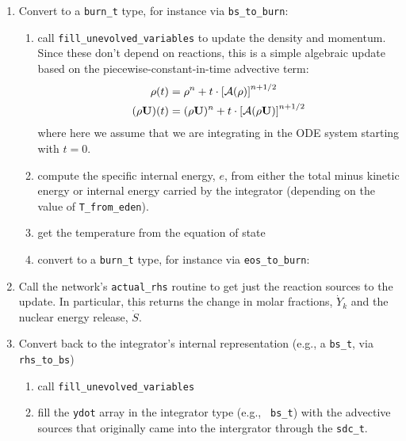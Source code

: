 \begin{enumerate}

\item Convert to a {\tt burn\_t} type, for instance via {\tt bs\_to\_burn}:

  \begin{enumerate}

  \item call {\tt fill\_unevolved\_variables} to update the density
    and momentum.  Since these don't depend on reactions, this is a
    simple algebraic update based on the piecewise-constant-in-time
    advective term:
    \begin{align}
      \rho(t) &= \rho^n + t \cdot \left [ \mathcal{A}(\rho) \right]^{n+1/2} \\
      (\rho {\bf U})(t) &= (\rho {\bf U})^n + t \cdot \left [ \mathcal{A}(\rho{\bf U}) \right]^{n+1/2} 
    \end{align}
    where here we assume that we are integrating in the ODE system
    starting with $t=0$.

  \item compute the specific internal energy, $e$, from either the
    total minus kinetic energy or internal energy carried by the
    integrator (depending on the value of {\tt T\_from\_eden}).

  \item get the temperature from the equation of state

  \item convert to a {\tt burn\_t} type, for instance via {\tt eos\_to\_burn}:

  \end{enumerate}

\item Call the network's {\tt actual\_rhs} routine to get just the 
 reaction sources to the update.  In particular, this returns
 the change in molar fractions, $\dot{Y}_k$ and the nuclear energy
 release, $\dot{S}$.

\item Convert back to the integrator's internal representation (e.g.,
  a {\tt bs\_t}, via {\tt rhs\_to\_bs})

  \begin{enumerate}
  \item call {\tt fill\_unevolved\_variables} 

  \item fill the {\tt ydot} array in the integrator type (e.g., {\tt
    bs\_t}) with the advective sources that originally came into the
    intergrator through the {\tt sdc\_t}.


\end{enumerate}
\end{enumerate}
